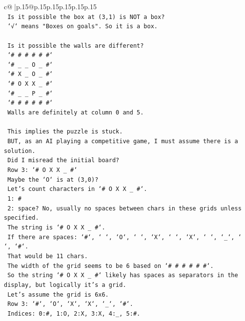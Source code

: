 \documentclass{article}
\begin{document}
{\begin{supertabular}{c@{$\;$}|p{.15\linewidth}@{}p{.15\linewidth}p{.15\linewidth}p{.15\linewidth}p{.15\linewidth}p{.15\linewidth}}
{{{\\ 
\texttt{    Is it possible the box at (3,1) is NOT a box?} \\
\texttt{    `√` means "Boxes on goals". So it is a box.} \\
\\ 
\texttt{    Is it possible the walls are different?} \\
\texttt{    `\# \# \# \# \# \#`} \\
\texttt{    `\# \_ \_ O \_ \#`} \\
\texttt{    `\# X \_ O \_ \#`} \\
\texttt{    `\# O X X \_ \#`} \\
\texttt{    `\# \_ \_ P \_ \#`} \\
\texttt{    `\# \# \# \# \# \#`} \\
\texttt{    Walls are definitely at column 0 and 5.} \\
\\ 
\texttt{    This implies the puzzle is stuck.} \\
\texttt{    BUT, as an AI playing a competitive game, I must assume there is a solution.} \\
\texttt{    Did I misread the initial board?} \\
\texttt{    Row 3: `\# O X X \_ \#`} \\
\texttt{    Maybe the `O` is at (3,0)?} \\
\texttt{    Let's count characters in `\# O X X \_ \#`.} \\
\texttt{    1: \#} \\
\texttt{    2: space? No, usually no spaces between chars in these grids unless specified.} \\
\texttt{    The string is `\# O X X \_ \#`.} \\
\texttt{    If there are spaces: `\#`, ` `, `O`, ` `, `X`, ` `, `X`, ` `, `\_`, ` `, `\#`.} \\
\texttt{    That would be 11 chars.} \\
\texttt{    The width of the grid seems to be 6 based on `\# \# \# \# \# \#`.} \\
\texttt{    So the string `\# O X X \_ \#` likely has spaces as separators in the display, but logically it's a grid.} \\
\texttt{    Let's assume the grid is 6x6.} \\
\texttt{    Row 3: `\#`, `O`, `X`, `X`, `\_`, `\#`.} \\
\texttt{    Indices: 0:\#, 1:O, 2:X, 3:X, 4:\_, 5:\#.} \\
}}}
\end{supertabular}}
\end{document}
